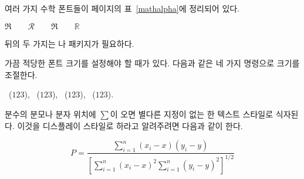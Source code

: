 여러 가지 수학 폰트들이 \pageref{mathalpha}페이지의 표~\ref{mathalpha}에 정리되어 있다.
\begin{example}
 $\Re \qquad
  \mathcal{R} \qquad
  \mathfrak{R} \qquad
  \mathbb{R} \qquad $  
\end{example}
\noindent 뒤의 두 가지는 나  패키지가 필요하다.

가끔 적당한 폰트 크기를 설정해야 할 때가 있다. 다음과 같은 네 가지 명령으로 크기를 조절한다.
\begin{flushleft}
~($\displaystyle 123$),
 ~($\textstyle 123$), 
~($\scriptstyle 123$),
~($\scriptscriptstyle 123$).
\end{flushleft}

분수의 분모나 분자 위치에 $\sum$이 오면 별다른 지정이 없는 한 텍스트 스타일로 식자된다.
이것을 디스플레이 스타일로 하라고 알려주려면 다음과 같이 한다.
\begin{example}
\begin{equation*}
 P = \frac{\displaystyle{ 
   \sum_{i=1}^n (x_i- x)
   (y_i- y)}} 
   {\displaystyle{\left[
   \sum_{i=1}^n(x_i-x)^2
   \sum_{i=1}^n(y_i- y)^2
   \right]^{1/2}}}
\end{equation*}    
\end{example}


